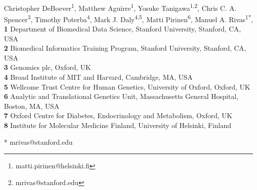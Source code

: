 
\newcommand{\lorem}{{\bf LOREM}}
\newcommand{\ipsum}{{\bf IPSUM}}

\def\bs{\boldsymbol}
\def\Vy{\widehat{\textrm{V}}_Y}



\vspace*{0.2in}

\begin{flushleft}
{\Large
\textbf{} %
}
\newline
\\
\author{Christopher DeBoever$^{1}$, Matthew Aguirre$^{1}$, Yosuke Tanigawa$^{1}$, Chris C. A. Spencer$^{2}$, Timothy Poterba$^{3}$, Mark J. Daly$^{3,4}$,  Matti Pirinen$^{5}$\thanks{matti.pirinen@helsinki.fi}, and Manuel A. Rivas$^{1}$\thanks{mrivas@stanford.edu}}
Christopher DeBoever\textsuperscript{1},
Matthew Aguirre\textsuperscript{1},
Yosuke Tanigawa\textsuperscript{1,2},
Chris C. A. Spencer\textsuperscript{3},
Timothy Poterba\textsuperscript{4},
Mark J. Daly\textsuperscript{4,5},
Matti Pirinen\textsuperscript{6},
Manuel A. Rivas\textsuperscript{1*},
\\
\bigskip
\textbf{1} Department of Biomedical Data Science, Stanford University, Stanford, CA, USA
\\
\textbf{2} Biomedical Informatics Training Program, Stanford University, Stanford, CA, USA
\\
\textbf{3} Genomics plc, Oxford, UK
\\
\textbf{4} Broad Institute of MIT and Harvard, Cambridge, MA, USA
\\
\textbf{5} Wellcome Trust Centre for Human Genetics, University of Oxford, Oxford, UK
\\
\textbf{6} Analytic and Translational Genetics Unit, Massachusetts General Hospital, Boston, MA, USA
\\
\textbf{7} Oxford Centre for Diabetes, Endocrinology and Metabolism, Oxford, UK
\\
\textbf{8} Institute for Molecular Medicine Finland, University of Helsinki, Finland
\\
\bigskip

* mrivas@stanford.edu

\end{flushleft}
